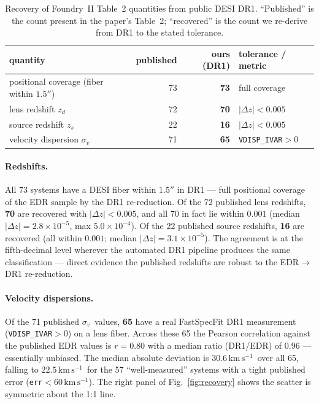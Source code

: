 \documentclass[11pt,letterpaper]{article}
\newcommand{\sigmav}{\ensuremath{\sigma_v}}
\newcommand{\zd}{\ensuremath{z_d}}
\newcommand{\zs}{\ensuremath{z_s}}
\newcommand{\dz}{\ensuremath{\Delta z}}
\newcommand{\kms}{\ensuremath{\mathrm{km\,s^{-1}}}}
\begin{document}
\begin{table}[ht]
\centering
\caption{Recovery of Foundry~II Table~2 quantities from public DESI DR1.
``Published'' is the count present in the paper's Table~2; ``recovered'' is the
count we re-derive from DR1 to the stated tolerance.}
\label{tab:headline}
\begin{tabular}{lrrl}
\toprule
quantity                                & published & ours (DR1) & tolerance / metric \\
\midrule
positional coverage (fiber within $1.5''$) & 73 & \textbf{73} & full coverage \\
lens redshift \zd                       & 72 & \textbf{70} & $|\dz|<0.005$ \\
source redshift \zs                     & 22 & \textbf{16} & $|\dz|<0.005$ \\
velocity dispersion \sigmav             & 71 & \textbf{65} & \texttt{VDISP\_IVAR}$>0$ \\
\bottomrule
\end{tabular}
\end{table}

\paragraph{Redshifts.}
All 73 systems have a DESI fiber within $1.5''$ in DR1 --- full positional
coverage of the EDR sample by the DR1 re-reduction. Of the 72 published lens
redshifts, \textbf{70} are recovered with $|\dz|<0.005$, and all 70 in fact lie
within $0.001$ (median $|\dz|=2.8\times10^{-5}$, max $5.0\times10^{-4}$). Of the
22 published source redshifts, \textbf{16} are recovered (all within $0.001$;
median $|\dz|=3.1\times10^{-5}$). The agreement is at the
fifth-decimal level wherever the automated DR1 pipeline produces the same
classification --- direct evidence the published redshifts are robust to the
EDR$\to$DR1 re-reduction.

\paragraph{Velocity dispersions.}
Of the 71 published \sigmav\ values, \textbf{65} have a real FastSpecFit DR1
measurement (\texttt{VDISP\_IVAR}$>0$) on a lens fiber. Across these 65 the
Pearson correlation against the published EDR values is $r=0.80$ with a median
ratio (DR1/EDR) of $0.96$ --- essentially unbiased. The median absolute
deviation is $30.6\,$\kms\ over all 65, falling to $\mathbf{22.5}\,$\kms\ for the
57 ``well-measured'' systems with a tight published error
(\texttt{err}$<60\,$\kms). The right panel of Fig.~\ref{fig:recovery} shows the
scatter is symmetric about the 1:1 line.
\end{document}
